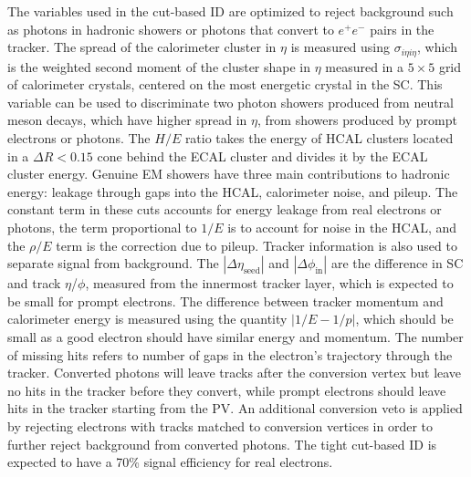 The variables used in the cut-based ID are optimized to reject background such as photons in hadronic showers or photons that convert to $e^+e^-$ pairs in the tracker. The spread of the calorimeter cluster in $\eta$ is measured using $\sigma_{i\eta i\eta}$, which is the weighted second moment of the cluster shape in $\eta$ measured in a $5\times5$ grid of calorimeter crystals, centered on the most energetic crystal in the SC. This variable can be used to discriminate two photon showers produced from neutral meson decays, which have higher spread in $\eta$, from showers produced by prompt electrons or photons. The $H/E$ ratio takes the energy of HCAL clusters located in a $\Delta R<0.15$ cone behind the ECAL cluster and divides it by the ECAL cluster energy. Genuine EM showers have three main contributions to hadronic energy: leakage through gaps into the HCAL, calorimeter noise, and pileup. The constant term in these cuts accounts for energy leakage from real electrons or photons, the term proportional to $1/E$ is to account for noise in the HCAL, and the $\rho/E$ term is the correction due to pileup. Tracker information is also used to separate signal from background. The $|\Delta\eta_\text{seed}|$ and $|\Delta\phi_\text{in}|$ are the difference in SC and track $\eta$/$\phi$, measured from the innermost tracker layer, which is expected to be small for prompt electrons. The difference between tracker momentum and calorimeter energy is measured using the quantity $|1/E-1/p|$, which should be small as a good electron should have similar energy and momentum. The number of missing hits refers to number of gaps in the electron's trajectory through the tracker. Converted photons will leave tracks after the conversion vertex but leave no hits in the tracker before they convert, while prompt electrons should leave hits in the tracker starting from the PV. An additional conversion veto is applied by rejecting electrons with tracks matched to conversion vertices in order to further reject background from converted photons. The tight cut-based ID is expected to have a 70\% signal efficiency for real electrons.

